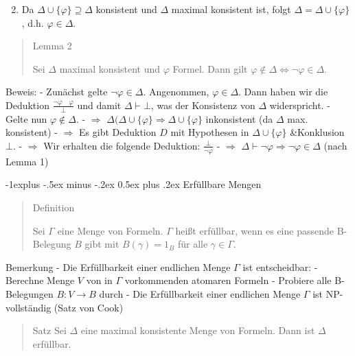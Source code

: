 \documentclass[a4paper]{article}
\makeatletter
\renewcommand{\subsection}{\@startsection{subsection}{2}{0mm}%
                {-1explus -.5ex minus -.2ex}%
                {0.5ex plus .2ex}%
                {\normalfont\normalsize\bfseries}}
\makeatother
\begin{document}
\begin{multicols}{3}
  \begin{enumerate}
    \setcounter{enumi}{1}
    \itemsep1pt\parskip0pt
    \item
          Da $\Delta\cup\{\varphi\}\supseteq\Delta$ konsistent und $\Delta$
          maximal konsistent ist, folgt $\Delta=\Delta\cup\{\varphi\}$, d.h.
          $\varphi\in\Delta$.
  \end{enumerate}

  \begin{quote}
    Lemma 2

    Sei $\Delta$ maximal konsistent und $\varphi$ Formel. Dann gilt
    $\varphi\not\in\Delta\Leftrightarrow\lnot\varphi\in\Delta$.
  \end{quote}

  Beweis: - Zunächst gelte $\lnot\varphi\in\Delta$. Angenommen,
  $\varphi\in\Delta$. Dann haben wir die Deduktion
  $\frac{\lnot\varphi\quad\varphi}{\bot}$ und damit $\Delta\vdash\bot$,
  was der Konsistenz von $\Delta$ widerspricht. - Gelte nun
  $\varphi\not\in\Delta$. - $\Rightarrow$
  $\Delta(\Delta\cup\{\varphi\}\Rightarrow\Delta\cup\{\varphi\}$
  inkonsistent (da $\Delta$ max. konsistent) - $\Rightarrow$ Es gibt
  Deduktion $D$ mit Hypothesen in $\Delta\cup\{\varphi\}$ \&Konklusion
  $\bot$. - $\Rightarrow$ Wir erhalten die folgende Deduktion:
  $\frac{\bot}{\lnot\varphi}$ - $\Rightarrow$
  $\Delta\vdash\lnot\varphi\Rightarrow\lnot\varphi\in\Delta$ (nach Lemma
  1)

  \subsection{Erfüllbare Mengen}\label{erfuxfcllbare-mengen}

  \begin{quote}
    Definition

    Sei $\Gamma$ eine Menge von Formeln. $\Gamma$ heißt erfüllbar, wenn es
    eine passende B-Belegung $B$ gibt mit $B(\gamma) = 1_B$ für alle
    $\gamma\in\Gamma$.
  \end{quote}

  Bemerkung - Die Erfüllbarkeit einer endlichen Menge $\Gamma$ ist
  entscheidbar: - Berechne Menge $V$ von in $\Gamma$ vorkommenden atomaren
  Formeln - Probiere alle B-Belegungen $B:V\rightarrow B$ durch - Die
  Erfüllbarkeit einer endlichen Menge $\Gamma$ ist NP-vollständig (Satz
  von Cook)

  \begin{quote}
    Satz Sei $\Delta$ eine maximal konsistente Menge von Formeln. Dann ist
    $\Delta$ erfüllbar.
  \end{quote}


\end{multicols}
\end{document}
